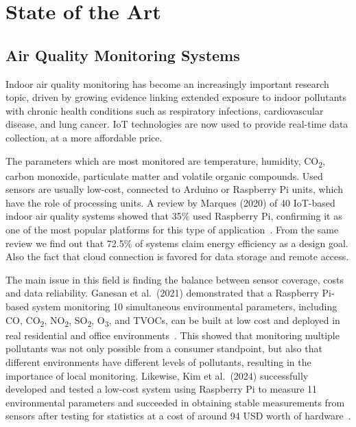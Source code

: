 % 

\chapter{State of the Art}
\label{ch:sota}

\section{Air Quality Monitoring Systems}
\label{sec:aq-monitoring}

Indoor air quality monitoring has become an increasingly important research topic, driven by
growing evidence linking extended exposure to indoor pollutants with chronic health conditions
such as respiratory infections, cardiovascular disease, and lung cancer. IoT technologies are
now used to provide real-time data collection, at a more affordable price.

The parameters which are most monitored are temperature, humidity, CO\textsubscript{2}, carbon
monoxide, particulate matter and volatile organic compounds. Used sensors are usually low-cost,
connected to Arduino or Raspberry Pi units, which have the role of processing units. A review
by Marques (2020) of 40 IoT-based indoor air quality systems showed that 35\% used
Raspberry Pi, confirming it as one of the most popular platforms for this type of
application~\cite{marques2020}. From the same review we find out that 72.5\% of systems claim
energy efficiency as a design goal. Also the fact that cloud connection is favored for data
storage and remote access.

The main issue in this field is finding the balance between sensor coverage, costs and data
reliability. Ganesan et al.\ (2021) demonstrated that a Raspberry Pi-based system monitoring
10 simultaneous environmental parameters, including CO, CO\textsubscript{2}, NO\textsubscript{2},
SO\textsubscript{2}, O\textsubscript{3}, and TVOCs, can be built at low cost and deployed in
real residential and office environments~\cite{ganesan2021}. This showed that monitoring
multiple pollutants was not only possible from a consumer standpoint, but also that different
environments have different levels of pollutants, resulting in the importance of local
monitoring. Likewise, Kim et al.\ (2024) successfully developed and tested a low-cost system
using Raspberry Pi to measure 11 environmental parameters and succeeded in obtaining stable
measurements from sensors after testing for statistics at a cost of around 94 USD worth of
hardware~\cite{kim2024}.

